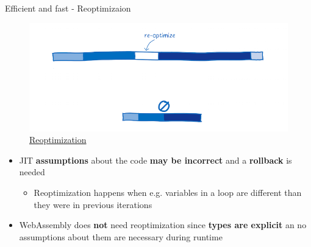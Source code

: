 \documentclass{beamer}
\begin{document}
\begin{frame}{Efficient and fast - Reoptimizaion}
    \begin{figure}
        \includegraphics[scale=0.2]{./images/re-optimize.png}
        \caption{\href{https://www.smashingmagazine.com/2017/05/abridged-cartoon-introduction-webassembly/}{Reoptimization}}
    \end{figure}
    \begin{itemize}
        \item JIT \textbf{assumptions} about the code \textbf{may be incorrect} and a \textbf{rollback} is needed
        \begin{itemize}
            \item Reoptimization happens when e.g. variables in a loop are different than they were in previous iterations
        \end{itemize}
        \item WebAssembly does \textbf{not} need reoptimization since \textbf{types are explicit} an no assumptions about them are necessary during runtime
    \end{itemize}
\end{frame}
\end{document}
